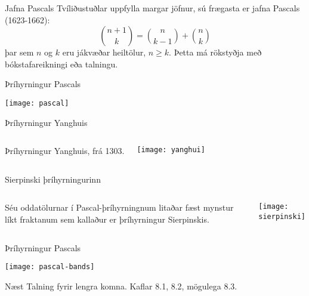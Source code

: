 \documentclass[handout]{beamer}
\begin{document}
\begin{frame}{Jafna Pascals}
Tvíliðustuðlar uppfylla margar jöfnur, sú frægasta er jafna Pascals (1623-1662):
\[
\binom{n+1}{k} = \binom{n}{k-1} + \binom{n}{k}
\]
þar sem $n$ og $k$ eru jákvæðar heiltölur, $n \geq k$. Þetta má rökstyðja með bókstafareikningi eða talningu.
\end{frame}

\begin{frame}{Þríhyrningur Pascals}
\begin{center}
\texttt{[image: pascal]}
\end{center}
\end{frame}

\begin{frame}{Þríhyrningur Yanghuis}
\begin{columns}
Þríhyrningur Yanghuis, frá 1303.
\begin{center}
\texttt{[image: yanghui]}
\end{center}
\end{columns}
\end{frame}

\begin{frame}{Sierpinski þríhyrningurinn}
\begin{columns}
Séu oddatölurnar í Pascal-þríhyrningnum litaðar fæst mynstur líkt fraktanum sem kallaður er þríhyrningur Sierpinskis.
\begin{center}
\texttt{[image: sierpinski]}
\end{center}

\end{columns}

\end{frame}

\begin{frame}{Þríhyrningur Pascals}
\begin{center}
\texttt{[image: pascal-bands]}
\end{center}
\end{frame}

\begin{frame}{Næst}
Talning fyrir lengra komna. Kaflar 8.1, 8.2, mögulega 8.3.
\end{frame}
\end{document}
